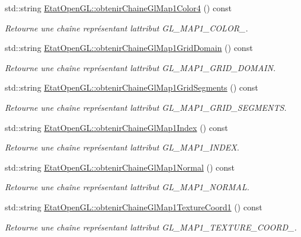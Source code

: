 \begin{DoxyCompactItemize}
std\+::string \hyperlink{group__utilitaire_gaa3e13a4accbc22c40a52ee9cee9fc3e0}{Etat\+Open\+G\+L\+::obtenir\+Chaine\+Gl\+Map1\+Color4} () const 
\begin{DoxyCompactList}\small\item\em Retourne une chaîne représentant l\textquotesingle{}attribut G\+L\+\_\+\+M\+A\+P1\+\_\+\+C\+O\+L\+O\+R\+\_. \end{DoxyCompactList}\item 
std\+::string \hyperlink{group__utilitaire_gad05cd2af4f512deb88aca0b00b0815c4}{Etat\+Open\+G\+L\+::obtenir\+Chaine\+Gl\+Map1\+Grid\+Domain} () const 
\begin{DoxyCompactList}\small\item\em Retourne une chaîne représentant l\textquotesingle{}attribut G\+L\+\_\+\+M\+A\+P1\+\_\+\+G\+R\+I\+D\+\_\+\+D\+O\+M\+A\+I\+N. \end{DoxyCompactList}\item 
std\+::string \hyperlink{group__utilitaire_gaef4171a2ed92756d394ed8bae1fc57cd}{Etat\+Open\+G\+L\+::obtenir\+Chaine\+Gl\+Map1\+Grid\+Segments} () const 
\begin{DoxyCompactList}\small\item\em Retourne une chaîne représentant l\textquotesingle{}attribut G\+L\+\_\+\+M\+A\+P1\+\_\+\+G\+R\+I\+D\+\_\+\+S\+E\+G\+M\+E\+N\+T\+S. \end{DoxyCompactList}\item 
std\+::string \hyperlink{group__utilitaire_ga52ba9a6fe299e4342d28baac6a83c769}{Etat\+Open\+G\+L\+::obtenir\+Chaine\+Gl\+Map1\+Index} () const 
\begin{DoxyCompactList}\small\item\em Retourne une chaîne représentant l\textquotesingle{}attribut G\+L\+\_\+\+M\+A\+P1\+\_\+\+I\+N\+D\+E\+X. \end{DoxyCompactList}\item 
std\+::string \hyperlink{group__utilitaire_gad0e75e07ddc5d51e11b4a9b525ee4190}{Etat\+Open\+G\+L\+::obtenir\+Chaine\+Gl\+Map1\+Normal} () const 
\begin{DoxyCompactList}\small\item\em Retourne une chaîne représentant l\textquotesingle{}attribut G\+L\+\_\+\+M\+A\+P1\+\_\+\+N\+O\+R\+M\+A\+L. \end{DoxyCompactList}\item 
std\+::string \hyperlink{group__utilitaire_gaf06cacbe0ee8f4fe4a6f56571fb8c27c}{Etat\+Open\+G\+L\+::obtenir\+Chaine\+Gl\+Map1\+Texture\+Coord1} () const 
\begin{DoxyCompactList}\small\item\em Retourne une chaîne représentant l\textquotesingle{}attribut G\+L\+\_\+\+M\+A\+P1\+\_\+\+T\+E\+X\+T\+U\+R\+E\+\_\+\+C\+O\+O\+R\+D\+\_. \end{DoxyCompactList}\item 

\end{DoxyCompactItemize}
